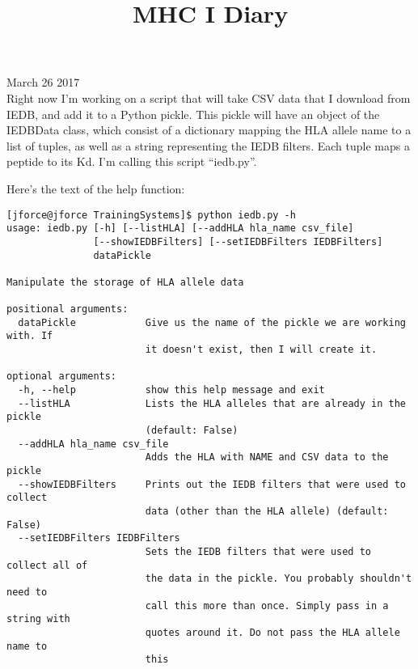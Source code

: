 \documentclass[11pt,letterpaper]{article}
\begin{document}

\title{MHC I Diary}

{\Huge March 26 2017}\\[5mm]

Right now I'm working on a script that will take CSV data that I download from IEDB, and add it to a Python pickle. This pickle will have an object of the IEDBData class, which consist of a dictionary mapping the HLA allele name to a list of tuples, as well as a string representing the IEDB filters. Each tuple maps a peptide to its Kd. I'm calling this script ``iedb.py''.


Here's the text of the help function:

\begin{lstlisting}
[jforce@jforce TrainingSystems]$ python iedb.py -h
usage: iedb.py [-h] [--listHLA] [--addHLA hla_name csv_file]
               [--showIEDBFilters] [--setIEDBFilters IEDBFilters]
               dataPickle

Manipulate the storage of HLA allele data

positional arguments:
  dataPickle            Give us the name of the pickle we are working with. If
                        it doesn't exist, then I will create it.

optional arguments:
  -h, --help            show this help message and exit
  --listHLA             Lists the HLA alleles that are already in the pickle
                        (default: False)
  --addHLA hla_name csv_file
                        Adds the HLA with NAME and CSV data to the pickle
  --showIEDBFilters     Prints out the IEDB filters that were used to collect
                        data (other than the HLA allele) (default: False)
  --setIEDBFilters IEDBFilters
                        Sets the IEDB filters that were used to collect all of
                        the data in the pickle. You probably shouldn't need to
                        call this more than once. Simply pass in a string with
                        quotes around it. Do not pass the HLA allele name to
                        this
\end{lstlisting}


\begin{activityTime}
\end{activityTime}
\end{document}
